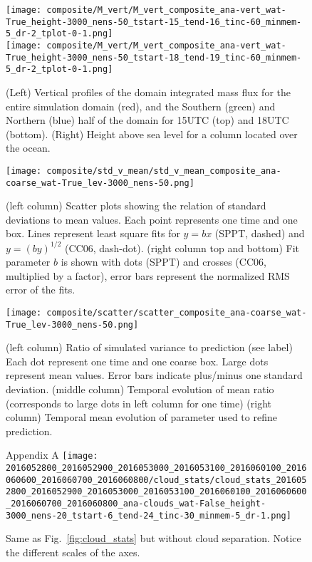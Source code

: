 \documentclass[a4paper, 12pt]{article}
\begin{document}
\begin{figure}[ht]
\noindent \centering
\texttt{[image: composite/M\_vert/M\_vert\_composite\_ana-vert\_wat-True\_height-3000\_nens-50\_tstart-15\_tend-16\_tinc-60\_minmem-5\_dr-2\_tplot-0-1.png]}\\
\texttt{[image: composite/M\_vert/M\_vert\_composite\_ana-vert\_wat-True\_height-3000\_nens-50\_tstart-18\_tend-19\_tinc-60\_minmem-5\_dr-2\_tplot-0-1.png]}\\
\caption{(Left) Vertical profiles of the domain integrated mass flux for the entire simulation domain (red), and the Southern (green) and Northern (blue) half of the domain for 15UTC (top) and 18UTC (bottom). (Right) Height above sea level for a column located over the ocean.} \label{fig:vert}
\end{figure}

\begin{figure}[ht]
\noindent \centering
\texttt{[image: composite/std\_v\_mean/std\_v\_mean\_composite\_ana-coarse\_wat-True\_lev-3000\_nens-50.png]}\\
\caption{(left column) Scatter plots showing the relation of standard deviations to mean values. Each point represents one time and one box. Lines represent least square fits for $y=bx$ (SPPT, dashed) and $y = (by)^{1/2}$ (CC06, dash-dot). (right column top and bottom) Fit parameter $b$ is shown with dots (SPPT) and crosses (CC06, multiplied by a factor), error bars represent the normalized RMS error of the fits.} \label{fig:std_v_mean}
\end{figure}

\begin{figure}[ht]
\noindent \centering
\texttt{[image: composite/scatter/scatter\_composite\_ana-coarse\_wat-True\_lev-3000\_nens-50.png]}\\
\caption{(left column) Ratio of simulated variance to prediction (see label) Each dot represent one time and one coarse box. Large dots represent mean values. Error bars indicate plus/minus one standard deviation. (middle column) Temporal evolution of mean ratio (corresponds to large dots in left column for one time) (right column) Temporal mean evolution of parameter used to refine prediction.} \label{fig:scatter}
\end{figure}

 \clearpage
\begin{figure}[ht]
\noindent \centering
Appendix A
\texttt{[image: 2016052800\_2016052900\_2016053000\_2016053100\_2016060100\_2016060600\_2016060700\_2016060800/cloud\_stats/cloud\_stats\_2016052800\_2016052900\_2016053000\_2016053100\_2016060100\_2016060600\_2016060700\_2016060800\_ana-clouds\_wat-False\_height-3000\_nens-20\_tstart-6\_tend-24\_tinc-30\_minmem-5\_dr-1.png]}\\
\caption{Same as Fig.~\ref{fig:cloud_stats} but without cloud separation. Notice the different scales of the axes.} \label{fig:cloud_stats_nowater}
\end{figure}
\end{document}
